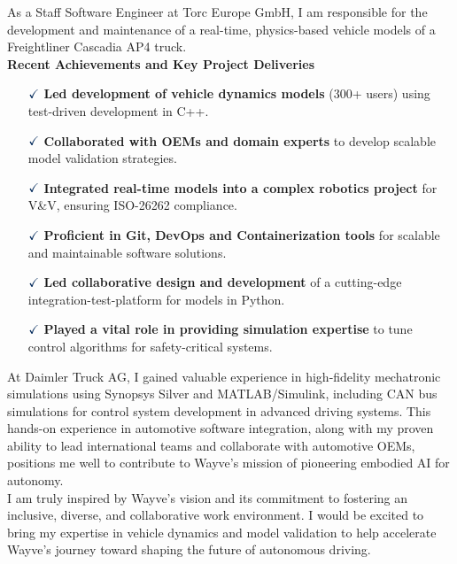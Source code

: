 \documentclass[a4paper,10pt]{article}
\begin{document}
\noindent As a Staff Software Engineer at Torc Europe GmbH, I am responsible
for the development and maintenance of a real-time, physics-based vehicle models
of a Freightliner Cascadia AP4 truck.\\

\noindent \textbf{Recent Achievements and Key Project Deliveries}
\vspace{0.1cm}
\begin{itemize}
    \item[$\textcolor{highlightcolor}{\checkmark}$] \textcolor{highlightcolor}{\textbf{Led development of vehicle dynamics models}} (300+ users) using test-driven development in C++.
    \item[$\textcolor{highlightcolor}{\checkmark}$] \textcolor{highlightcolor}{\textbf{Collaborated with OEMs and domain experts}} to develop scalable model validation strategies. 
    \item[$\textcolor{highlightcolor}{\checkmark}$] \textcolor{highlightcolor}{\textbf{Integrated real-time models into a complex robotics project}} for V\&V, ensuring ISO-26262 compliance.
    \item[$\textcolor{highlightcolor}{\checkmark}$] \textcolor{highlightcolor}{\textbf{Proficient in Git, DevOps and Containerization tools}} for scalable and maintainable software solutions.
    \item[$\textcolor{highlightcolor}{\checkmark}$] \textcolor{highlightcolor}{\textbf{Led collaborative design and development}} of a cutting-edge integration-test-platform for models in Python.
    \item[$\textcolor{highlightcolor}{\checkmark}$] \textcolor{highlightcolor}{\textbf{Played a vital role in providing simulation expertise}} to tune control algorithms for safety-critical systems.
\end{itemize}

\noindent At Daimler Truck AG, I gained valuable experience in high-fidelity
mechatronic simulations using Synopsys Silver and MATLAB/Simulink, including
CAN bus simulations for control system development in advanced driving systems.
This hands-on experience in automotive software integration, along with my
proven ability to lead international teams and collaborate with automotive
OEMs, positions me well to contribute to Wayve's mission of pioneering embodied
AI for autonomy.\\

\noindent I am truly inspired by Wayve’s vision and its commitment to fostering
an inclusive, diverse, and collaborative work environment. I would be excited
to bring my expertise in vehicle dynamics and model validation to help
accelerate Wayve’s journey toward shaping the future of autonomous driving.\\
\end{document}

